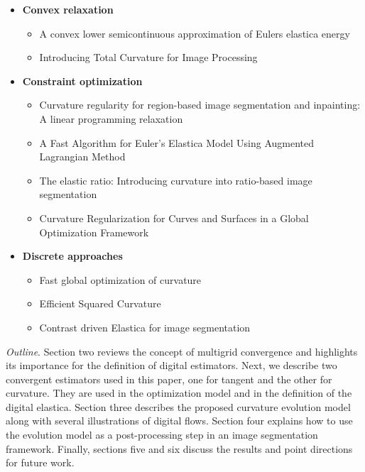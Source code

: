 \documentclass[runningheads]{llncs}
\begin{document}
\begin{itemize}
\item{\textbf{Convex relaxation}}
  \begin{itemize}
  \item{A convex lower semicontinuous approximation of Eulers elastica energy \cite{bredies15convex}}				\item{Introducing Total Curvature for Image Processing \cite{goldluecke11totalcurvature}}
  \end{itemize}	
  
\item{\textbf{Constraint optimization}}
  \begin{itemize}
  \item{Curvature regularity for region-based image segmentation and inpainting: A linear programming relaxation \cite{schoenemann09linear} }	
  \item{A Fast Algorithm for Euler's Elastica Model Using Augmented Lagrangian Method \cite{tai11elastica} }		
  \item{The elastic ratio: Introducing curvature into ratio-based image segmentation \cite{schoenemann2011elastic} }		
  \item{Curvature Regularization for Curves and Surfaces in a Global Optimization Framework \cite{strandmark11globalframework} }
  \end{itemize}
  
\item{\textbf{Discrete approaches}}
  \begin{itemize}
  \item{Fast global optimization of curvature \cite{zehiry10fast}	}
  \item{Efficient Squared Curvature \cite{nieuwenhuis14efficient} 	}
  \item{Contrast driven {E}lastica for image segmentation \cite{el2016contrast} }	
  \end{itemize}
  
	
\end{itemize}


\textit{Outline}. Section two reviews the concept of multigrid
convergence and highlights its importance for the definition of
digital estimators. Next, we describe two convergent estimators used
in this paper, one for tangent and the other for curvature. They are
used in the optimization model and in the definition of the digital
elastica. Section three describes the proposed curvature evolution
model along with several illustrations of digital flows. Section four
explains how to use the evolution model as a post-processing step in
an image segmentation framework. Finally, sections five and six
discuss the results and point directions for future work.
\end{document}
